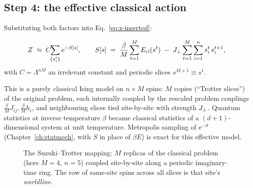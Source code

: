 \subsection{Step 4: the effective classical action}

Substituting both factors into Eq.~\eqref{eq:z-inserted}:

\begin{keyeq}
\begin{equation}
Z\;\approx\;C\!\!\sum_{\{s^t_i\}}\mathrm{e}^{-S[s]},
\qquad
S[s]\;=\;\frac{\beta}{M}\sum_{t=1}^{M}E_{\mathrm{cl}}(s^t)
\;-\;J_{\perp}\sum_{t=1}^{M}\sum_{i=1}^{n}s^t_i\,s^{t+1}_i ,
\label{eq:action}
\end{equation}
with $C=\Lambda^{nM}$ an irrelevant constant and periodic slices
$s^{M+1}\equiv s^1$.
\end{keyeq}

This is a purely classical Ising model on $n\times M$ spins: $M$ copies
(``Trotter slices'') of the original problem, each internally coupled by the
rescaled problem couplings $\frac{\beta}{M}J_{ij},\frac{\beta}{M}h_i$, and
neighbouring slices tied site-by-site with strength $J_{\perp}$. Quantum
statistics at inverse temperature $\beta$ became classical statistics of a
$(d{+}1)$-dimensional system at unit temperature. Metropolis sampling of
$\mathrm{e}^{-S}$ (Chapter~\ref{ch:statmech}, with $S$ in place of
$\beta E$) is exact for this effective model.

\begin{figure}[ht]
\centering
{}
\caption{The Suzuki--Trotter mapping: $M$ replicas of the classical problem
(here $M{=}4$, $n{=}5$) coupled site-by-site along a periodic imaginary-time
ring. The row of same-site spins across all slices is that site's
\emph{worldline}.}
\label{fig:trotter}
\end{figure}

